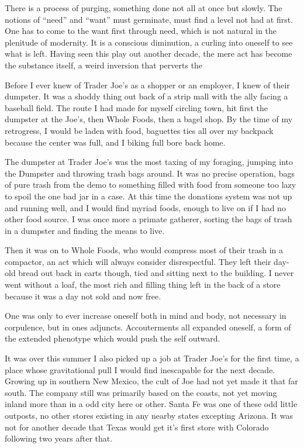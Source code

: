 \documentclass[ebook, 10pt, openright, onecolumn]{memoir}
\newcommand*\td[1]{
  \todo[inline]{
     #1 
  }
}
\newcommand*\finish{\td{ ----- Finish this section -----}}
\begin{document}
There is a process of purging, something done not all at once but slowly.  The
notions of ``need'' and ``want'' must germinate, must find a level not had at
first.  One has to come to the want first through need, which is not natural in
the plenitude of modernity.  It is a conscious diminution, a curling into
oneself to see what is left.  Having seen this play out another decade, the mere
act has become the substance itself, a weird inversion that perverts the


\finish

Before I ever knew of Trader Joe's as a shopper or an employer, I knew of their
dumpster.  It was a shoddy thing out back of a strip mall with the ally facing a
baseball field.  The route I had made for myself circling town, hit first the
dumpster at the Joe's, then Whole Foods, then a bagel shop.  By the time
of my retrogress, I would be laden with food, baguettes ties all over my
backpack because the center was full, and I biking full bore back home.

The dumpster at Trader Joe's was the most taxing of my foraging, jumping into
the Dumpster and throwing trash bags around.  It was no precise operation,
bags of pure trash from the demo to something filled with food from someone too
lazy to spoil the one bad jar in a case.  At this time the donations system was
not up and running well, and I would find myriad foods, enough to live on if I
had no other food source.  I was once more a primate gatherer, sorting the bags
of trash in a dumpster and finding the means to live.

Then it was on to Whole Foods, who would compress most of their trash in a
compactor, an act which will always consider disrespectful.  They left their
day-old bread out back in carts though, tied and sitting next to the building.
I never went without a loaf, the most rich and filling thing left in the back of
a store because it was a day not sold and now free.  

One was only to ever increase oneself both in mind and body, not
necessary in corpulence, but in ones adjuncts.  Accouterments all expanded
oneself, a form of the extended phenotype which would push the self outward.


It was over this summer I also picked up a job at Trader Joe's for the first
time, a place whose gravitational pull I would find inescapable for the next
decade.  Growing up in southern New Mexico, the cult of Joe had not yet made it
that far south.  The company still was primarily based on the coasts, not yet
moving inland more than in a odd city here or other. Santa Fe was one of these
odd little outposts, no other stores existing in any nearby states excepting
Arizona.  It was not for another decade that Texas  would get it's first
store with Colorado following two years after that.
\end{document}

